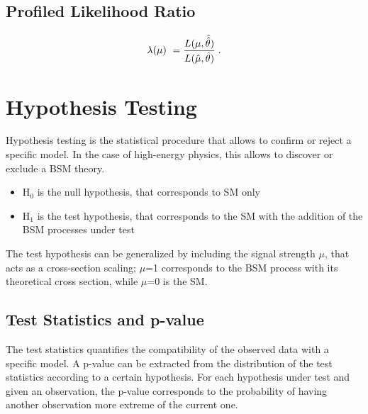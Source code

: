 \subsection{Profiled Likelihood Ratio}

\begin{equation}
\label{eq:stat:prl}
\lambda(\mu) \  = \frac{ L(\mu,
\hat{\hat{\theta}}) } {L(\hat{\mu}, \hat{\theta}) } \;.
\end{equation}


\section{Hypothesis Testing}
\label{sec:stat:ht}

Hypothesis testing is the statistical procedure that allows to confirm or reject a specific model. In the case of high-energy physics, this allows to discover or exclude a BSM theory. 

\begin{itemize}
\item H$_0$ is the null hypothesis, that corresponds to SM only
\item H$_1$ is the test hypothesis, that corresponds to the SM with the addition of the BSM processes under test
\end{itemize}

The test hypothesis can be generalized by including the signal strength $\mu$, that acts as a cross-section scaling; $\mu$=1 corresponds to the BSM process with its theoretical cross section, while $\mu$=0 is the SM.

\subsection{Test Statistics and p-value}

The test statistics quantifies the compatibility of the observed data with a specific model.
A p-value can be extracted from the distribution of the test statistics according to a certain hypothesis. For each hypothesis under test and given an observation, the p-value corresponds to the probability of having another observation more extreme of the current one.

\iffalse
Points to discuss
- correspondence between p-values and sigma
- arbitrary choice 
- note that excluding one hypothesis does not mean stating that the other is true
- using 95 CLs for discovery would mean claiming 1/20 of the times that the SM is false
- ATTENZIONE: al momento ho delle inconsistenza della definizione di t_mu: e' l'integrale da -inf a t_obs o da t_obs a +inf
\fi 

